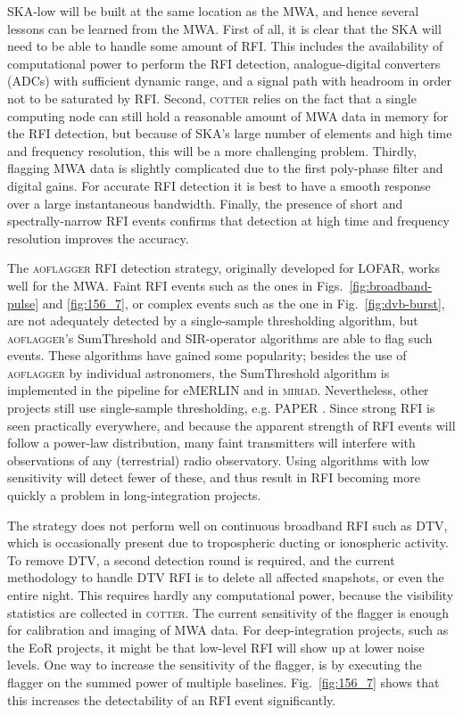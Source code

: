 \documentclass{pasa}
\begin{document}
SKA-low will be built at the same location as the MWA, and hence several lessons can be learned from the MWA. First of all, it is clear that the SKA will need to be able to handle some amount of RFI. This includes the availability of computational power to perform the RFI detection, analogue-digital converters (ADCs) with sufficient dynamic range, and a signal path with headroom in order not to be saturated by RFI. Second, \textsc{cotter} relies on the fact that a single computing node can still hold a reasonable amount of MWA data in memory for the RFI detection, but because of SKA's large number of elements and high time and frequency resolution, this will be a more challenging problem. Thirdly, flagging MWA data is slightly complicated due to the first poly-phase filter and digital gains. For accurate RFI detection it is best to have a smooth response over a large instantaneous bandwidth. Finally, the presence of short and spectrally-narrow RFI events confirms that detection at high time and frequency resolution improves the accuracy.

The \textsc{aoflagger} RFI detection strategy, originally developed for LOFAR, works well for the MWA. Faint RFI events such as the ones in Figs.~\ref{fig:broadband-pulse} and \ref{fig:156_7}, or complex events such as the one in Fig.~\ref{fig:dvb-burst}, are not adequately detected by a single-sample thresholding algorithm, but \textsc{aoflagger}'s SumThreshold and SIR-operator algorithms are able to flag such events. These algorithms have gained some popularity; besides the use of \textsc{aoflagger} by individual astronomers, the SumThreshold algorithm is implemented in the pipeline for eMERLIN \citep{serpent-peck-2013} and in \textsc{miriad}. Nevertheless, other projects still use single-sample thresholding, e.g. PAPER \citep{parsons-paper-eorlimit-2014}. Since strong RFI is seen practically everywhere, and because the apparent strength of RFI events will follow a power-law distribution, many faint transmitters will interfere with observations of any (terrestrial) radio observatory. Using algorithms with low sensitivity will detect fewer of these, and thus result in RFI becoming more quickly a problem in long-integration projects.

The strategy does not perform well on continuous broadband RFI such as DTV, which is occasionally present due to tropospheric ducting or ionospheric activity. To remove DTV, a second detection round is required, and the current methodology to handle DTV RFI is to delete all affected snapshots, or even the entire night. This requires hardly any computational power, because the visibility statistics are collected in \textsc{cotter}. The current sensitivity of the flagger is enough for calibration and imaging of MWA data. For deep-integration projects, such as the EoR projects, it might be that low-level RFI will show up at lower noise levels. One way to increase the sensitivity of the flagger, is by executing the flagger on the summed power of multiple baselines. Fig.~\ref{fig:156_7} shows that this increases the detectability of an RFI event significantly.
\end{document}
